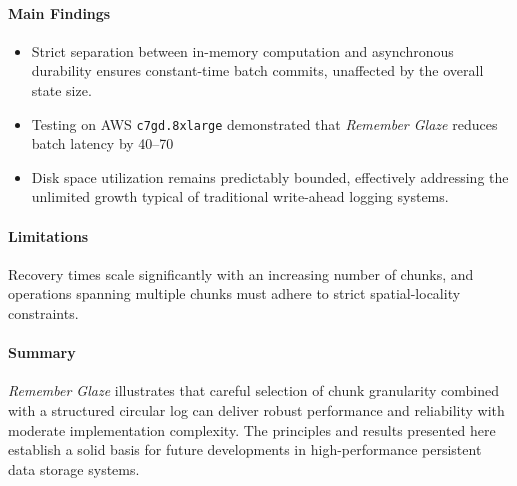 \documentclass[conference]{IEEEtran}
\begin{document}
\paragraph{Main Findings}
\begin{itemize}
\item Strict separation between in-memory computation and asynchronous durability ensures constant-time batch commits, unaffected by the overall state size.
\item Testing on AWS \texttt{c7gd.8xlarge} demonstrated that \textit{Remember Glaze} reduces batch latency by 40–70%
\item Disk space utilization remains predictably bounded, effectively addressing the unlimited growth typical of traditional write-ahead logging systems.
\end{itemize}

\paragraph{Limitations}
Recovery times scale significantly with an increasing number of chunks, and operations spanning multiple chunks must adhere to strict spatial-locality constraints.

\paragraph{Summary}
\textit{Remember Glaze} illustrates that careful selection of chunk granularity combined with a structured circular log can deliver robust performance and reliability with moderate implementation complexity. The principles and results presented here establish a solid basis for future developments in high-performance persistent data storage systems.
\end{document}
